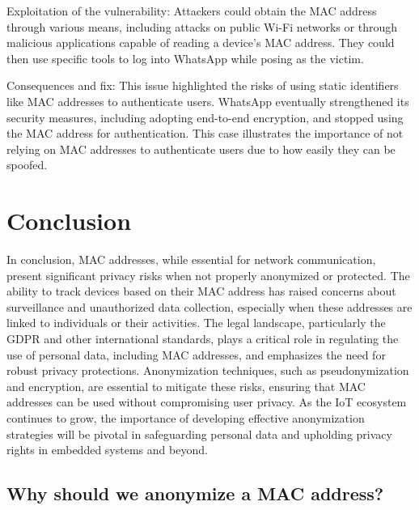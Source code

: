 \documentclass[aps,prb,twocolumn,superscriptaddress,floatfix,longbibliography,nofootinbib]{revtex4-2}
\begin{document}
Exploitation of the vulnerability:
Attackers could obtain the MAC address through various means, including attacks on public Wi-Fi networks
or through malicious applications capable of reading a device's MAC address. They could then use specific tools
to log into WhatsApp while posing as the victim.

Consequences and fix:
This issue highlighted the risks of using static identifiers like MAC addresses to authenticate users.
WhatsApp eventually strengthened its security measures, including adopting end-to-end encryption, 
and stopped using the MAC address for authentication. This case illustrates the importance 
of not relying on MAC addresses to authenticate users due to how easily they can be spoofed.






\section{\label{sec:Conclusion}Conclusion}
In conclusion, MAC addresses, while essential for network communication, present 
significant privacy risks when not properly anonymized or protected. The ability 
to track devices based on their MAC address has raised concerns about surveillance 
and unauthorized data collection, especially when these addresses are linked to 
individuals or their activities. The legal landscape, particularly the GDPR and 
other international standards, plays a critical role in regulating the use of 
personal data, including MAC addresses, and emphasizes the need for robust privacy 
protections. Anonymization techniques, such as pseudonymization and encryption, 
are essential to mitigate these risks, ensuring that MAC addresses can be used 
without compromising user privacy. As the IoT ecosystem continues to grow, the 
importance of developing effective anonymization strategies will be pivotal in 
safeguarding personal data and upholding privacy rights in embedded systems and 
beyond.
\subsection{\label{sec:Why}Why should we anonymize a MAC address?}




\end{document}
